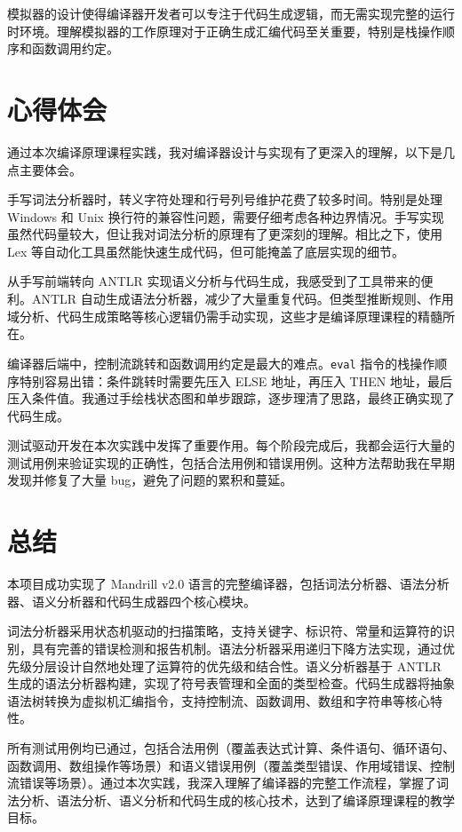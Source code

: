 \documentclass[12pt,hyperref,a4paper,UTF8]{ctexart}
\begin{document}
模拟器的设计使得编译器开发者可以专注于代码生成逻辑，而无需实现完整的运行时环境。理解模拟器的工作原理对于正确生成汇编代码至关重要，特别是栈操作顺序和函数调用约定。

\section{心得体会}

通过本次编译原理课程实践，我对编译器设计与实现有了更深入的理解，以下是几点主要体会。

手写词法分析器时，转义字符处理和行号列号维护花费了较多时间。特别是处理 Windows 和 Unix 换行符的兼容性问题，需要仔细考虑各种边界情况。手写实现虽然代码量较大，但让我对词法分析的原理有了更深刻的理解。相比之下，使用 Lex 等自动化工具虽然能快速生成代码，但可能掩盖了底层实现的细节。

从手写前端转向 ANTLR 实现语义分析与代码生成，我感受到了工具带来的便利。ANTLR 自动生成语法分析器，减少了大量重复代码。但类型推断规则、作用域分析、代码生成策略等核心逻辑仍需手动实现，这些才是编译原理课程的精髓所在。

编译器后端中，控制流跳转和函数调用约定是最大的难点。\texttt{eval} 指令的栈操作顺序特别容易出错：条件跳转时需要先压入 ELSE 地址，再压入 THEN 地址，最后压入条件值。我通过手绘栈状态图和单步跟踪，逐步理清了思路，最终正确实现了代码生成。

测试驱动开发在本次实践中发挥了重要作用。每个阶段完成后，我都会运行大量的测试用例来验证实现的正确性，包括合法用例和错误用例。这种方法帮助我在早期发现并修复了大量 bug，避免了问题的累积和蔓延。

\section{总结}

本项目成功实现了 Mandrill v2.0 语言的完整编译器，包括词法分析器、语法分析器、语义分析器和代码生成器四个核心模块。

词法分析器采用状态机驱动的扫描策略，支持关键字、标识符、常量和运算符的识别，具有完善的错误检测和报告机制。语法分析器采用递归下降方法实现，通过优先级分层设计自然地处理了运算符的优先级和结合性。语义分析器基于 ANTLR 生成的语法分析器构建，实现了符号表管理和全面的类型检查。代码生成器将抽象语法树转换为虚拟机汇编指令，支持控制流、函数调用、数组和字符串等核心特性。

所有测试用例均已通过，包括合法用例（覆盖表达式计算、条件语句、循环语句、函数调用、数组操作等场景）和语义错误用例（覆盖类型错误、作用域错误、控制流错误等场景）。通过本次实践，我深入理解了编译器的完整工作流程，掌握了词法分析、语法分析、语义分析和代码生成的核心技术，达到了编译原理课程的教学目标。
\end{document}
